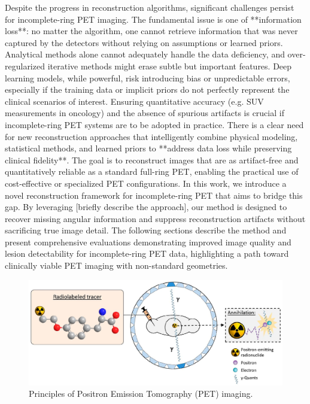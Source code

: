 \documentclass[
reprint,
superscriptaddress,
nofootinbib,
amsmath,amssymb,
aps,
prd,
]{revtex4-2}
\begin{document}
Despite the progress in reconstruction algorithms, significant challenges persist for incomplete-ring PET imaging. The fundamental issue is one of **information loss**: no matter the algorithm, one cannot retrieve information that was never captured by the detectors without relying on assumptions or learned priors. Analytical methods alone cannot adequately handle the data deficiency, and over-regularized iterative methods might erase subtle but important features. Deep learning models, while powerful, risk introducing bias or unpredictable errors, especially if the training data or implicit priors do not perfectly represent the clinical scenarios of interest. Ensuring quantitative accuracy (e.g. SUV measurements in oncology) and the absence of spurious artifacts is crucial if incomplete-ring PET systems are to be adopted in practice. There is a clear need for new reconstruction approaches that intelligently combine physical modeling, statistical methods, and learned priors to **address data loss while preserving clinical fidelity**. The goal is to reconstruct images that are as artifact-free and quantitatively reliable as a standard full-ring PET, enabling the practical use of cost-effective or specialized PET configurations. In this work, we introduce a novel reconstruction framework for incomplete-ring PET that aims to bridge this gap. By leveraging [briefly describe the approach], our method is designed to recover missing angular information and suppress reconstruction artifacts without sacrificing true image detail. The following sections describe the method and present comprehensive evaluations demonstrating improved image quality and lesion detectability for incomplete-ring PET data, highlighting a path toward clinically viable PET imaging with non-standard geometries.



\begin{figure}[htbp]
	\centering
	\includegraphics[scale=0.47]{./Images/graph.jpg}
	\caption{Principles of Positron Emission Tomography (PET) imaging.}
	\label{fig:graph}
\end{figure}
\end{document}
